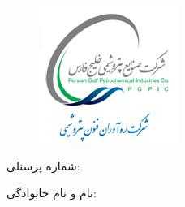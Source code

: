 \documentclass{article}
\begin{document}
\begin{figure}[t]
\includegraphics[scale=0.7]{arm.PNG}
\centering
\end{figure}
شماره پرسنلی: 
\raisebox{0.8ex}{\ya}

\vspace{2mm}
نام و نام خانوادگی:
\raisebox{0.9ex}{\yb}
\end{document}

